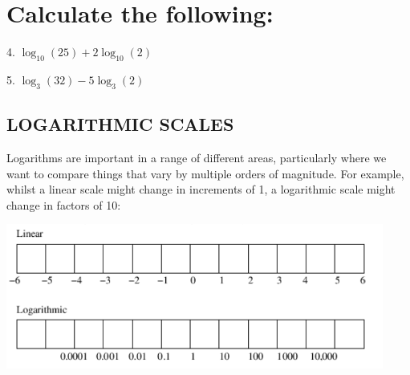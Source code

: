 \documentclass[12pt]{article}
\begin{document}
\section*{Calculate the following:} \vspace{10pt}

\noindent \vspace{10pt} 4. $\log_{10}(25) + 2\log_{10}(2)$ \vspace{25pt}
\noindent \makebox[\linewidth]{\dotfill}
\vspace{25pt}
\noindent \makebox[\linewidth]{\dotfill}
\vspace{25pt}
\noindent \makebox[\linewidth]{\dotfill}
\vspace{10pt}

\noindent \vspace{10pt} 5. $\log_{3}(32) - 5\log_{3}(2)$ \vspace{25pt}
\noindent \makebox[\linewidth]{\dotfill}
\vspace{25pt}
\noindent \makebox[\linewidth]{\dotfill}
\vspace{25pt}
\noindent \makebox[\linewidth]{\dotfill}

\subsection*{LOGARITHMIC SCALES}
Logarithms are important in a range of different areas, particularly where we want to compare things that vary by multiple orders of magnitude. For example, whilst a linear scale might change in increments of 1, a logarithmic scale might change in factors of 10:

\begin{center}
\includegraphics[width=0.93\textwidth]{linear_log_scale.png} \\


\vfill %
\flushleft
\end{center}

\end{document}
